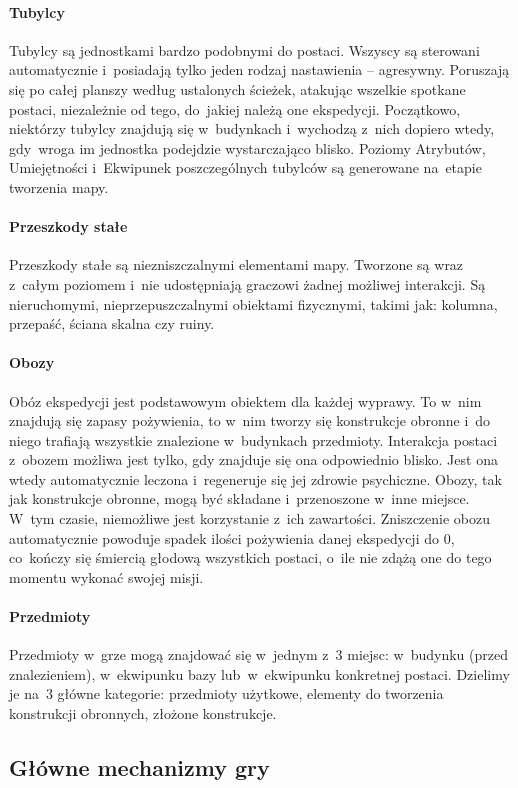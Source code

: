 \documentclass[licencjacka]{pracamgr}
\begin{document}
      \paragraph{Tubylcy}
	Tubylcy są jednostkami bardzo podobnymi do postaci. Wszyscy są sterowani automatycznie i~posiadają tylko jeden rodzaj
	nastawienia -- agresywny. Poruszają się po całej planszy według ustalonych ścieżek, atakując wszelkie spotkane postaci,
	niezależnie od tego, do~jakiej należą one ekspedycji. Początkowo, niektórzy tubylcy znajdują się w~budynkach i~wychodzą
	z~nich dopiero wtedy, gdy~wroga im jednostka podejdzie wystarczająco blisko. Poziomy Atrybutów, Umiejętności i~Ekwipunek poszczególnych
	tubylców są generowane na~etapie tworzenia mapy.
      \paragraph{Przeszkody stałe}
	Przeszkody stałe są niezniszczalnymi elementami mapy. Tworzone są wraz z~całym poziomem i~nie udostępniają graczowi żadnej
	możliwej interakcji. Są nieruchomymi, nieprzepuszczalnymi obiektami fizycznymi, takimi jak: kolumna, przepaść, ściana skalna czy ruiny.
      \paragraph{Obozy}
	Obóz ekspedycji jest podstawowym obiektem dla każdej wyprawy. To w~nim znajdują się zapasy pożywienia, to w~nim tworzy
	się konstrukcje obronne i~do niego trafiają wszystkie znalezione w~budynkach przedmioty. Interakcja postaci z~obozem
	możliwa jest tylko, gdy znajduje się ona odpowiednio blisko. Jest ona wtedy automatycznie leczona i~regeneruje się
	jej zdrowie psychiczne. Obozy, tak jak konstrukcje obronne, mogą być składane i~przenoszone w~inne miejsce. W~tym czasie,
	niemożliwe jest korzystanie z~ich zawartości. Zniszczenie obozu automatycznie powoduje spadek ilości pożywienia danej
	ekspedycji do 0, co~kończy się śmiercią głodową wszystkich postaci, o~ile nie zdążą one do tego momentu wykonać swojej misji.
      \paragraph{Przedmioty}
	Przedmioty w~grze mogą znajdować się w~jednym z~3 miejsc: w~budynku (przed znalezieniem), w~ekwipunku bazy lub~w~ekwipunku konkretnej
	postaci. Dzielimy je na~3 główne kategorie: przedmioty użytkowe, elementy do tworzenia konstrukcji obronnych, złożone konstrukcje.

    \subsection{Główne mechanizmy gry}
\end{document}
